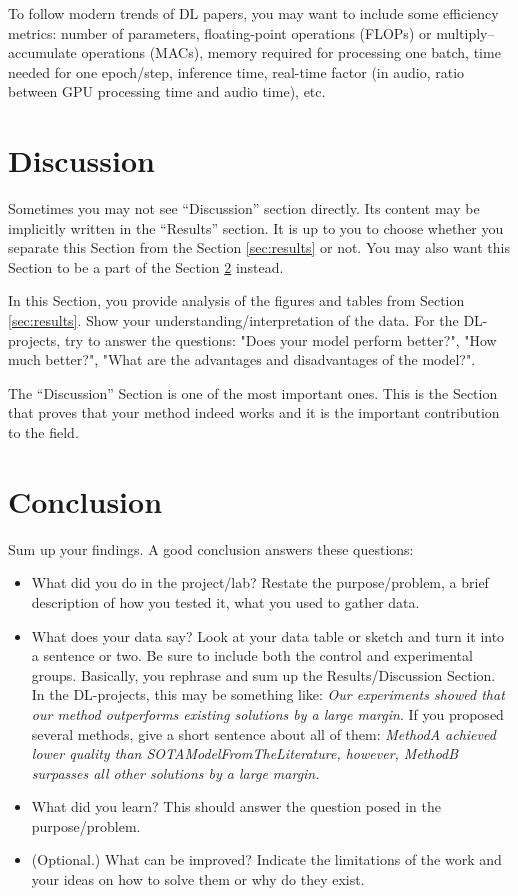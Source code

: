 \documentclass[10pt,conference,compsocconf]{IEEEtran}
\begin{document}
To follow modern trends of DL papers, you may want to include some efficiency metrics: number of parameters, floating-point operations (FLOPs) or multiply–accumulate operations (MACs), memory required for processing one batch, time needed for one epoch/step, inference time, real-time factor (in audio, ratio between GPU processing time and audio time), etc. 

\section{Discussion}
Sometimes you may not see ``Discussion'' section directly. Its content may be implicitly written in the ``Results'' section. It is up to you to choose whether you separate this Section from the Section \ref{sec:results} or not. You may also want this Section to be a part of the Section \ref{sec:conclusion} instead.

In this Section, you provide analysis of the figures and tables from Section \ref{sec:results}. Show your understanding/interpretation of the data. For the DL-projects, try to answer the questions: "Does your model perform better?", "How much better?", "What are the advantages and disadvantages of the model?".

The ``Discussion'' Section is one of the most important ones. This is the Section that proves that your method indeed works and it is the important contribution to the field.


\section{Conclusion}\label{sec:conclusion}
Sum up your findings. A good conclusion answers these questions:
\begin{itemize}

\item What did you do in the project/lab? Restate the purpose/problem, a brief description of how you tested it, what you used to gather data.
\item What does your data say? Look at your data table or sketch and turn it into a sentence or two. Be sure to include both the control and experimental groups. Basically, you rephrase and sum up the Results/Discussion Section. In the DL-projects, this may be something like: \textit{Our experiments showed that our method outperforms existing solutions by a large margin}. If you proposed several methods, give a short sentence about all of them: \textit{MethodA achieved lower quality than SOTAModelFromTheLiterature, however, MethodB surpasses all other solutions by a large margin.}
\item What did you learn? This should answer the question posed in the purpose/problem.
\item (Optional.) What can be improved? Indicate the limitations of the work and your ideas on how to solve them or why do they exist.
\end{itemize}
\end{document}
